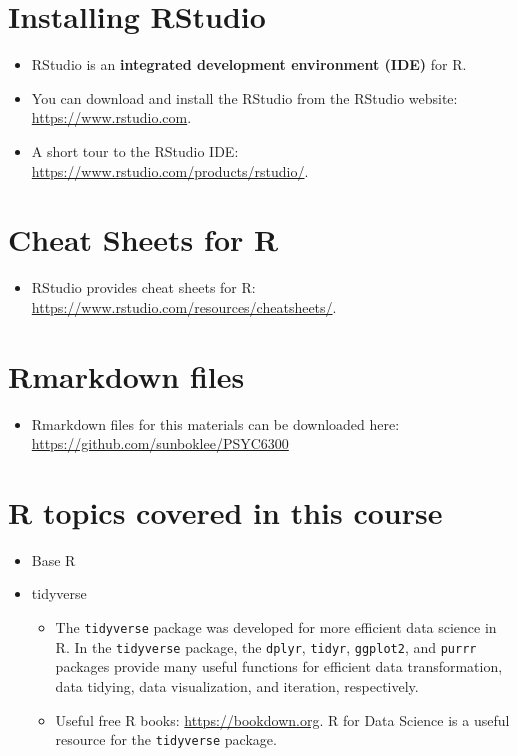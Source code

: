 \documentclass[]{book}
\providecommand{\tightlist}{%
  \setlength{\itemsep}{0pt}\setlength{\parskip}{0pt}}
\begin{document}
\hypertarget{installing-rstudio}{%
\section{Installing RStudio}\label{installing-rstudio}}

\begin{itemize}
\item
  RStudio is an \textbf{integrated development environment (IDE)} for R.
\item
  You can download and install the RStudio from the RStudio website: \url{https://www.rstudio.com}.
\item
  A short tour to the RStudio IDE: \url{https://www.rstudio.com/products/rstudio/}.
\end{itemize}

\hypertarget{cheat-sheets-for-r}{%
\section{Cheat Sheets for R}\label{cheat-sheets-for-r}}

\begin{itemize}
\tightlist
\item
  RStudio provides cheat sheets for R: \url{https://www.rstudio.com/resources/cheatsheets/}.
\end{itemize}

\hypertarget{rmarkdown-files}{%
\section{Rmarkdown files}\label{rmarkdown-files}}

\begin{itemize}
\tightlist
\item
  Rmarkdown files for this materials can be downloaded here: \url{https://github.com/sunboklee/PSYC6300}
\end{itemize}

\hypertarget{r-topics-covered-in-this-course}{%
\section{R topics covered in this course}\label{r-topics-covered-in-this-course}}

\begin{itemize}
\tightlist
\item
  Base R
\item
  tidyverse

  \begin{itemize}
  \tightlist
  \item
    The \texttt{tidyverse} package was developed for more efficient data science in R. In the \texttt{tidyverse} package, the \texttt{dplyr}, \texttt{tidyr}, \texttt{ggplot2}, and \texttt{purrr} packages provide many useful functions for efficient data transformation, data tidying, data visualization, and iteration, respectively.
  \item
    Useful free R books: \url{https://bookdown.org}. R for Data Science \citep{Wickham} is a useful resource for the \texttt{tidyverse} package.
  \end{itemize}
\end{itemize}
\end{document}
